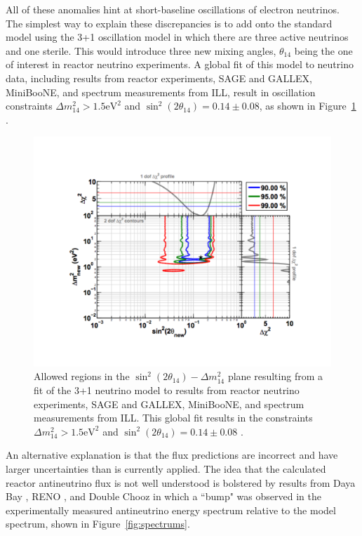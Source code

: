 All of these anomalies hint at short-baseline oscillations of electron neutrinos. 
The simplest way to explain these discrepancies is to add onto the standard model using the 3+1 oscillation model in which there are three active neutrinos and one sterile. This would introduce three new mixing angles, $\theta_{14}$ being the one of interest in reactor neutrino experiments.
A global fit of this model to neutrino data, including results from reactor experiments, SAGE and GALLEX, MiniBooNE, and spectrum measurements from ILL, result in oscillation constraints $\Delta m^2_{14} > 1.5 \textrm{eV}^2$ and $\sin^2(2\theta_{14}) = 0.14 \pm 0.08$, as shown in Figure~\ref{fig:raabestfitpoint} \cite{Mention:2011rk}.

\begin{figure}[t]
	\centering
	\includegraphics[width=0.7\linewidth]{tex/3-reactorneutrinos-images/RAA_BestFitPoint}
	\caption[]{Allowed regions in the $\sin^2(2\theta_{14})-\Delta m^2_{14}$ plane resulting from a fit of the 3+1 neutrino model to results from reactor neutrino experiments, SAGE and GALLEX, MiniBooNE, and spectrum measurements from ILL. This global fit results in the constraints $\Delta m^2_{14} > 1.5 \textrm{eV}^2$ and $\sin^2(2\theta_{14}) = 0.14 \pm 0.08$ \cite{Mention:2011rk}.}
	\label{fig:raabestfitpoint}
\end{figure}

An alternative explanation is that the flux predictions are incorrect and have larger uncertainties than is currently applied. 
The idea that the calculated reactor antineutrino flux is not well understood is bolstered by results from Daya Bay \cite{DayaBayAnomaly}, RENO \cite{Seo:2016uom}, and Double Chooz \cite{DoubleChooz:2019qbj} in which a ``bump" was observed in the experimentally measured antineutrino energy spectrum relative to the model spectrum, shown in Figure~\ref{fig:spectrums}.

